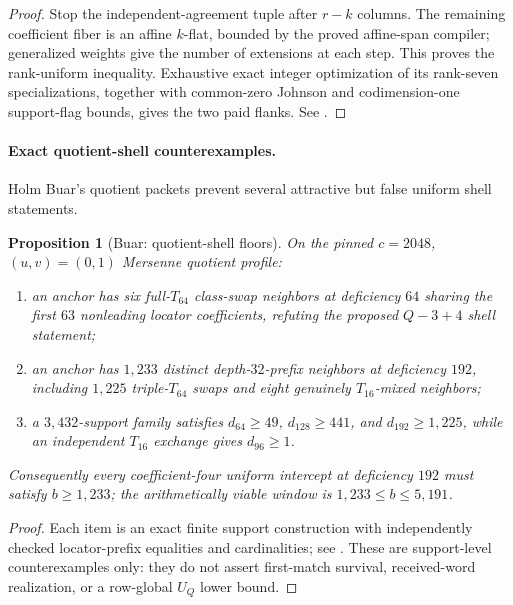 \documentclass[11pt,a4paper]{amsart}
\numberwithin{equation}{section}
\newtheorem{proposition}[theorem]{Proposition}
\theoremstyle{remark}
\begin{document}
\begin{proof}
Stop the independent-agreement tuple after $r-k$ columns.  The remaining coefficient fiber is an affine $k$-flat, bounded by the proved affine-span compiler; generalized weights give the number of extensions at each step.  This proves the rank-uniform inequality.  Exhaustive exact integer optimization of its rank-seven specializations, together with common-zero Johnson and codimension-one support-flag bounds, gives the two paid flanks.  See \cite{HughesM31Rank726}.
\end{proof}

\paragraph{Exact quotient-shell counterexamples.}
Holm Buar's quotient packets prevent several attractive but false uniform shell statements.

\begin{proposition}[Buar: quotient-shell floors]\label{prop:m31-quotient-floors}
On the pinned $c=2048$, $(u,v)=(0,1)$ Mersenne quotient profile:
\begin{enumerate}[label=\textup{(\roman*)},leftmargin=*]
\item an anchor has six full-$T_{64}$ class-swap neighbors at deficiency $64$ sharing the first $63$ nonleading locator coefficients, refuting the proposed $Q{-}3{+}4$ shell statement;
\item an anchor has $1{,}233$ distinct depth-$32$-prefix neighbors at deficiency $192$, including $1{,}225$ triple-$T_{64}$ swaps and eight genuinely $T_{16}$-mixed neighbors;
\item a $3{,}432$-support family satisfies $d_{64}\ge49$, $d_{128}\ge441$, and $d_{192}\ge1{,}225$, while an independent $T_{16}$ exchange gives $d_{96}\ge1$.
\end{enumerate}
Consequently every coefficient-four uniform intercept at deficiency $192$ must satisfy $b\ge1{,}233$; the arithmetically viable window is $1{,}233\le b\le5{,}191$.
\end{proposition}

\begin{proof}
Each item is an exact finite support construction with independently checked locator-prefix equalities and cardinalities; see \cite{BuarM31Q6426,BuarM31Q1626}.  These are support-level counterexamples only: they do not assert first-match survival, received-word realization, or a row-global $U_Q$ lower bound.
\end{proof}
\end{document}
